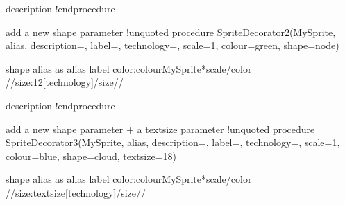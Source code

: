 \documentclass[letterpaper,10pt,english]{sphinxmanual}
\begin{document}
\begin{sphinxVerbatim}[commandchars=\\\{\},numbers=left,firstnumber=1,stepnumber=1]
  \PYGZdl{}description\PYGZdq{}
!endprocedure

\PYGZsq{}add a new shape parameter
\PYGZsq{}\PYGZhy{}\PYGZhy{}\PYGZhy{}\PYGZhy{}\PYGZhy{}\PYGZhy{}\PYGZhy{}\PYGZhy{}\PYGZhy{}\PYGZhy{}\PYGZhy{}\PYGZhy{}\PYGZhy{}\PYGZhy{}\PYGZhy{}\PYGZhy{}\PYGZhy{}\PYGZhy{}\PYGZhy{}\PYGZhy{}\PYGZhy{}\PYGZhy{}\PYGZhy{}\PYGZhy{}\PYGZhy{}\PYGZhy{}\PYGZhy{}\PYGZhy{}\PYGZhy{}\PYGZhy{}\PYGZhy{}\PYGZhy{}\PYGZhy{}\PYGZhy{}\PYGZhy{}\PYGZhy{}\PYGZhy{}\PYGZhy{}\PYGZhy{}\PYGZhy{}\PYGZhy{}\PYGZhy{}\PYGZhy{}\PYGZhy{}\PYGZhy{}\PYGZhy{}\PYGZhy{}\PYGZhy{}\PYGZhy{}\PYGZhy{}\PYGZhy{}
!unquoted procedure \PYGZdl{}SpriteDecorator2(\PYGZdl{}MySprite, \PYGZdl{}alias, \PYGZdl{}description=\PYGZdq{}\PYGZdq{}, \PYGZdl{}label=\PYGZdq{}\PYGZdq{}, \PYGZdl{}technology=\PYGZdq{}\PYGZdq{}, \PYGZdl{}scale=1, \PYGZdl{}colour=\PYGZdq{}green\PYGZdq{}, \PYGZdl{}shape=\PYGZdq{}node\PYGZdq{})

\PYGZdl{}shape \PYGZdl{}alias as \PYGZdq{}
\PYGZlt{}\PYGZlt{}\PYGZdl{}alias\PYGZgt{}\PYGZgt{}
\PYGZdl{}label
\PYGZlt{}color:\PYGZdl{}colour\PYGZgt{}\PYGZlt{}\PYGZdl{}MySprite*\PYGZdl{}scale\PYGZgt{}\PYGZlt{}/color\PYGZgt{}
//\PYGZlt{}size:12\PYGZgt{}[\PYGZdl{}technology]\PYGZlt{}/size\PYGZgt{}//

  \PYGZdl{}description\PYGZdq{}
!endprocedure

\PYGZsq{}add a new shape parameter + a textsize parameter
\PYGZsq{}\PYGZhy{}\PYGZhy{}\PYGZhy{}\PYGZhy{}\PYGZhy{}\PYGZhy{}\PYGZhy{}\PYGZhy{}\PYGZhy{}\PYGZhy{}\PYGZhy{}\PYGZhy{}\PYGZhy{}\PYGZhy{}\PYGZhy{}\PYGZhy{}\PYGZhy{}\PYGZhy{}\PYGZhy{}\PYGZhy{}\PYGZhy{}\PYGZhy{}\PYGZhy{}\PYGZhy{}\PYGZhy{}\PYGZhy{}\PYGZhy{}\PYGZhy{}\PYGZhy{}\PYGZhy{}\PYGZhy{}\PYGZhy{}\PYGZhy{}\PYGZhy{}\PYGZhy{}\PYGZhy{}\PYGZhy{}\PYGZhy{}\PYGZhy{}\PYGZhy{}\PYGZhy{}\PYGZhy{}\PYGZhy{}\PYGZhy{}\PYGZhy{}\PYGZhy{}\PYGZhy{}\PYGZhy{}\PYGZhy{}\PYGZhy{}\PYGZhy{}
!unquoted procedure \PYGZdl{}SpriteDecorator3(\PYGZdl{}MySprite, \PYGZdl{}alias, \PYGZdl{}description=\PYGZdq{}\PYGZdq{}, \PYGZdl{}label=\PYGZdq{}\PYGZdq{}, \PYGZdl{}technology=\PYGZdq{}\PYGZdq{}, \PYGZdl{}scale=1, \PYGZdl{}colour=\PYGZdq{}blue\PYGZdq{}, \PYGZdl{}shape=\PYGZdq{}cloud\PYGZdq{}, \PYGZdl{}textsize=\PYGZdq{}18\PYGZdq{})

\PYGZdl{}shape \PYGZdl{}alias as \PYGZdq{}
\PYGZlt{}\PYGZlt{}\PYGZdl{}alias\PYGZgt{}\PYGZgt{}
\PYGZdl{}label
\PYGZlt{}color:\PYGZdl{}colour\PYGZgt{}\PYGZlt{}\PYGZdl{}MySprite*\PYGZdl{}scale\PYGZgt{}\PYGZlt{}/color\PYGZgt{}
//\PYGZlt{}size:\PYGZdl{}textsize\PYGZgt{}[\PYGZdl{}technology]\PYGZlt{}/size\PYGZgt{}//


\end{sphinxVerbatim}
\end{document}
